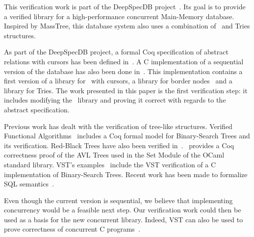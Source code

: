 This verification work is part of the DeepSpecDB project~\cite{deepdb}.
Its goal is to provide a verified library for a high-performance concurrent Main-Memory database.
Inspired by MassTree, this database system also uses a combination of \btrees\ and Tries structures.

As part of the DeepSpecDB project, a formal Coq specification of abstract relations with cursors has been defined in~\cite{brian}.
A C implementation of a sequential version of the database has also been done in~\cite{tosin}.
This implementation contains a first version of a library for \btrees\ with cursors, a library for border nodes~\cite{masstree} and a library for Tries.
The work presented in this paper is the first verification step: it includes modifying the \btrees\ library and proving it correct with regards to the abstract specification.

Previous work has dealt with the verification of tree-like structures.
Verified Functional Algorithms~\cite{vfa} includes a Coq formal model for Binary-Search Trees and its verification.
Red-Black Trees have also been verified in~\cite{redblack}. \cite{functors}~provides a Coq correctness proof of the AVL Trees used in the Set Module of the OCaml standard library.
VST's examples~\cite{vst} include the VST verification of a C implementation of Binary-Search Trees.
Recent work has been made to formalize SQL semantics~\cite{coqsql}.

Even though the current version is sequential, we believe that implementing concurrency would be a feasible next step.
Our verification work could then be used as a basis for the new concurrent library.
Indeed, VST can also be used to prove correctness of concurrent C programs~\cite{messaging}.

